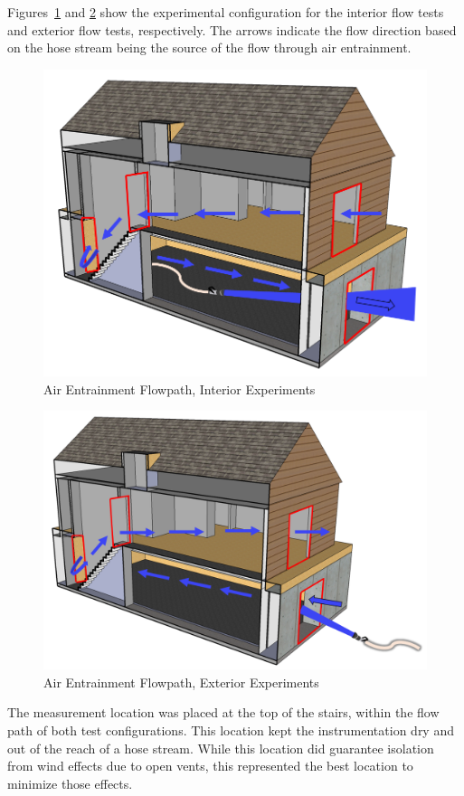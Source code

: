 \documentclass[12pt,oneside]{book}
\begin{document}
Figures~\ref{fig:Air_Entrainment_Flowpath_Interior_Experiments} and \ref{fig:Air_Entrainment_Flowpath_Exterior_Experiments} show the experimental configuration for the interior flow tests and exterior flow tests, respectively. The arrows indicate the flow direction based on the hose stream being the source of the flow through air entrainment.

\begin{figure}[!ht]
	\centering
	\includegraphics[width=.7\columnwidth]{Figures/Air_Entrainment/Airflow_Layout}
	\caption{Air Entrainment Flowpath, Interior Experiments}
	\label{fig:Air_Entrainment_Flowpath_Interior_Experiments}
\end{figure}

\begin{figure}[!ht]
	\centering
	\includegraphics[width=.7\columnwidth]{Figures/Air_Entrainment/Airflow_Layout_Ext}
	\caption{Air Entrainment Flowpath, Exterior Experiments}
	\label{fig:Air_Entrainment_Flowpath_Exterior_Experiments}
\end{figure}

The measurement location was placed at the top of the stairs, within the flow path of both test configurations. This location kept the instrumentation dry and out of the reach of a hose stream. While this location did guarantee isolation from wind effects due to open vents, this represented the best location to minimize those effects.
\end{document}

